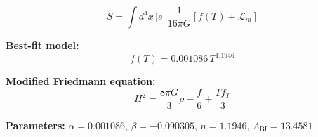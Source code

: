 
\begin{equation}
  S = \int d^4x \, |e| \, \frac{1}{16\pi G} \left[ f(T) + \mathcal{L}_m \right]
\end{equation}

\textbf{Best-fit model:}
\begin{equation}
  f(T) = 0.001086 \, T^{1.1946}
\end{equation}

\textbf{Modified Friedmann equation:}
\begin{equation}
  H^2 = \frac{8\pi G}{3} \rho - \frac{f}{6} + \frac{T f_T}{3}
\end{equation}

\textbf{Parameters:}
$\alpha = 0.001086$, \quad
$\beta = -0.090305$, \quad
$n = 1.1946$, \quad
$\Lambda_{\text{BI}} = 13.4581$